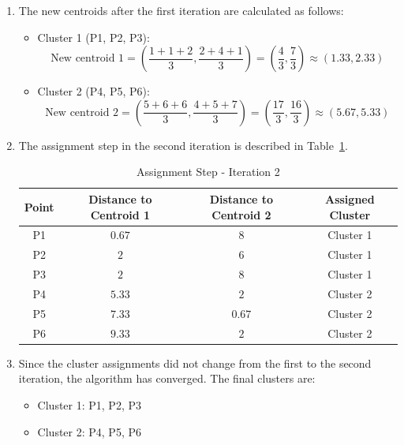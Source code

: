 \documentclass[12pt]{article}
\begin{document}
\begin{ejercicio}
\begin{enumerate}
            \item The new centroids after the first iteration are calculated as follows:
            \begin{itemize}
                \item Cluster 1 (P1, P2, P3):
                \begin{equation*}
                    \text{New centroid 1} = \left(\frac{1 + 1 + 2}{3}, \frac{2 + 4 + 1}{3}\right) = \left(\frac{4}{3}, \frac{7}{3}\right) \approx (1.33, 2.33)
                \end{equation*}
                
                \item Cluster 2 (P4, P5, P6):
                \begin{equation*}
                    \text{New centroid 2} = \left(\frac{5 + 6 + 6}{3}, \frac{4 + 5 + 7}{3}\right) = \left(\frac{17}{3}, \frac{16}{3}\right)\approx (5.67, 5.33)
                \end{equation*}
            \end{itemize}

            \item The assignment step in the second iteration is described in Table~\ref{tab:kmeans_iteration2}.
            \begin{table}[h!]
            \centering
            \begin{tabular}{|c|c|c|c|}
            \hline
            \textbf{Point} & \textbf{Distance to Centroid 1} & \textbf{Distance to Centroid 2} & \textbf{Assigned Cluster} \\ \hline
            P1 & $0.67$ & $8$ & Cluster 1 \\ \hline
            P2 & $2$ & $6$ & Cluster 1 \\ \hline
            P3 & $2$ & $8$ & Cluster 1 \\ \hline
            P4 & $5.33$ & $2$ & Cluster 2 \\ \hline
            P5 & $7.33$ & $0.67$ & Cluster 2 \\ \hline
            P6 & $9.33$ & $2$ & Cluster 2 \\ \hline
            \end{tabular}
            \caption{Assignment Step - Iteration 2}
            \label{tab:kmeans_iteration2}
            \end{table}

            \item Since the cluster assignments did not change from the first to the second iteration, the algorithm has converged. The final clusters are:
            \begin{itemize}
                \item Cluster 1: P1, P2, P3
                \item Cluster 2: P4, P5, P6
            \end{itemize}
        \end{enumerate}
    \end{ejercicio}
\end{document}
